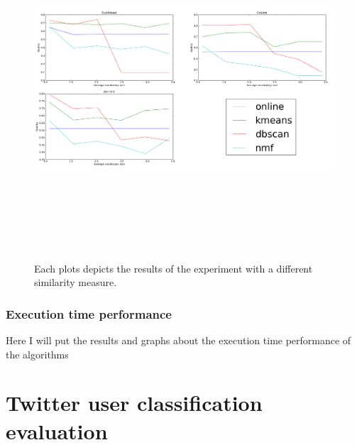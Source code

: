 \begin{figure}[htbp]
  \begin{center}
    \includegraphics[height=5in, width=6in]{vocabulary}
    \caption{Each plots depicts the results of the experiment with a different similarity measure.}
    \label{DifferentVocabularyResults}
  \end{center}
\end{figure}

\subsubsection{Execution time performance}
Here I will put the results and graphs about the execution time performance of the algorithms

\section{Twitter user classification evaluation}


